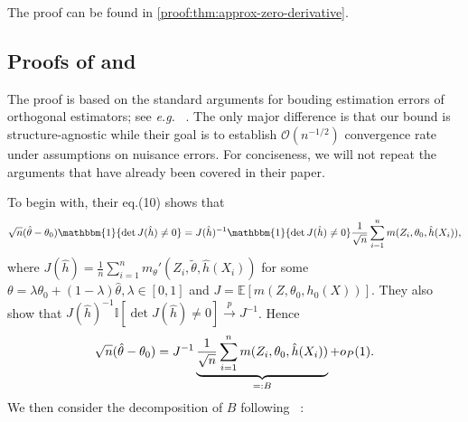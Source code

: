 \documentclass{article}
\def\gO{{\mathcal{O}}}
\newcommand{\E}{\mathbb{E}}
\begin{document}
%
The proof can be found in \cref{proof:thm:approx-zero-derivative}.
%

%
%
%
%
%
%
%
%
%
%
%
%
%
%
%
%
%
%
%
%
%
%
%
%
%
%
%
%

\subsection{Proofs of   and }
\label{subsec:proof-general-upper-bound}

The proof is based on the standard arguments for bouding estimation errors of orthogonal estimators; see \emph{e.g.} ~\cite[Section A]{mackey2018orthogonal}. The only major difference is that our bound is structure-agnostic while their goal is to establish $\gO(n^{-1/2})$ convergence rate under assumptions on nuisance errors. For conciseness, we will not repeat the arguments that have already been covered in their paper. 

To begin with, their eq.(10) shows that
\begin{equation}
    \notag
    \sqrt{n}(\hat{\theta}-\theta_0)\mathbbm{1}\{\det J(\hat{h})\neq 0\} = J(\hat{h})^{-1}\mathbbm{1}\{\det J(\hat{h})\neq 0\}\frac{1}{\sqrt{n}}\sum_{i=1}^n m(Z_i,\theta_0,\hat{h}(X_i)),
\end{equation}
where $J(\hat{h})=\frac{1}{n}\sum_{i=1}^n m_{\theta}'(Z_i,\tilde{\theta},\hat{h}(X_i))$ for some $\theta=\lambda\theta_0 + (1-\lambda)\hat{\theta}, \lambda\in[0,1]$ and $J = \E[m(Z,\theta_0,h_0(X))]$. They also show that $J(\hat{h})^{-1} \mathbb{I}[\operatorname{det} J(\hat{h}) \neq 0] \xrightarrow{p} J^{-1}$. Hence 
\begin{equation}
    \notag
    \sqrt{n}(\hat{\theta}-\theta_0) = J^{-1} \underbrace{\frac{1}{\sqrt{n}}\sum_{i=1}^n m(Z_i,\theta_0,\hat{h}(X_i))}_{=:B} + o_P(1).
\end{equation}
We then consider the decomposition of $B$ following ~\cite[eq.(11)]{mackey2018orthogonal}:
\end{document}

